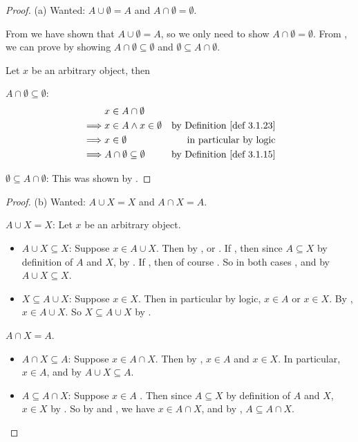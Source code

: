 \begin{proof}{(a)} Wanted: \(A \cup \emptyset = A\) and \(A \cap \emptyset = \emptyset\).

From  we have shown that \(A \cup \emptyset = A\), so we only need to show \(A \cap \emptyset = \emptyset\). From , we can prove by showing \(A \cap \emptyset \subseteq \emptyset\) and \(\emptyset \subseteq A \cap \emptyset\).

Let \(x\) be an arbitrary object, then

\(A \cap \emptyset \subseteq \emptyset\): 
\begin{align*}
         & x \in A \cap \emptyset \\
    \implies & x \in A \land x \in \emptyset & \text{by \DEF{3.1.23}} \\
    \implies & x \in \emptyset & \text{in particular by logic} \\
    \implies & A \cap \emptyset \subseteq \emptyset & \text{by \DEF{3.1.15}}
\end{align*}

\(\emptyset \subseteq A \cap \emptyset\): This was shown by .
\end{proof}

\begin{proof}{(b)} Wanted: \(A \cup X = X\) and \(A \cap X = A\).

\(A \cup X = X\): Let \(x\) be an arbitrary object.
\begin{itemize}
    \item \(A \cup X \subseteq X\): Suppose \(x \in A \cup X\). Then by ,  or . If , then since \(A \subseteq X\) by definition of \(A\) and \(X\),  by . If , then of course . So in both cases , and by  \(A \cup X \subseteq X\).
    \item \(X \subseteq A \cup X\): Suppose \(x \in X\). Then in particular by logic, \(x \in A\) or \(x \in X\). By , \(x \in A \cup X\). So \(X \subseteq A \cup X\) by .
\end{itemize}

\(A \cap X = A\).
\begin{itemize}
    \item \(A \cap X \subseteq A\): Suppose \(x \in A \cap X\). Then by , \(x \in A\) and \(x \in X\). In particular, \(x \in A\),  and by  \(A \cup X \subseteq A\).
    \item \(A \subseteq A \cap X\): Suppose \(x \in A\) . Then since \(A \subseteq X\) by definition of \(A\) and \(X\), \(x \in X\)  by . So by  and , we have \(x \in A \cap X\), and by , \(A \subseteq A \cap X\).
\end{itemize}
\end{proof}

